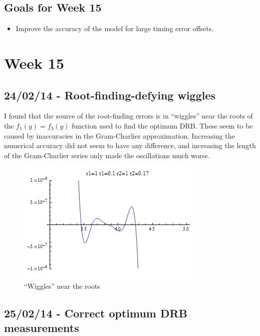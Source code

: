 \subsection{Goals for Week 15}

\begin{itemize}
\itemsep1pt\parskip0pt
\item
  Improve the accuracy of the model for large timing error offsets.
\end{itemize}

\section{Week 15}

\subsection{24/02/14 - Root-finding-defying wiggles}

I found that the source of the root-finding errors is in ``wiggles''
near the roots of the $f_1(y)=f_3(y)$ function used to find the optimum
DRB. These seem to be caused by inaccuracies in the Gram-Charlier
approximation. Increasing the numerical accuracy did not seem to have
any difference, and increasing the length of the Gram-Charlier series
only made the oscillations much worse.

\begin{figure}[htbp]
\centering
\includegraphics{../plots/rootfindingconfusion_M20_cropped.png}
\caption{``Wiggles'' near the roots}
\end{figure}

\subsection{25/02/14 - Correct optimum DRB measurements}

